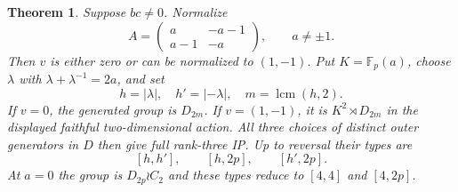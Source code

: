 \documentclass[11pt]{article}
\newtheorem{theorem}{Theorem}\newtheorem{lemma}[theorem]{Lemma}
\newcommand{\F}{\mathbb F}\newcommand{\gen}[1]{\langle#1\rangle}
\begin{document}
\begin{theorem}\label{generic}
Suppose $bc\ne0$. Normalize
\[
 A=\begin{pmatrix}a&-a-1\\a-1&-a\end{pmatrix},\qquad a\ne\pm1.
                                                               \tag{2}
\]
Then $v$ is either zero or can be normalized to $(1,-1)$.
Put $K=\F_p(a)$, choose $\lambda$ with
$\lambda+\lambda^{-1}=2a$, and set
\[
 h=|\lambda|,\quad h'=|{-\lambda}|,\quad m=\operatorname{lcm}(h,2).
\]
If $v=0$, the generated group is $D_{2m}$. If $v=(1,-1)$, it is
$K^2\rtimes D_{2m}$ in the displayed faithful two-dimensional action.
All three choices of distinct outer generators in $D$ then give full
rank-three IP. Up to reversal their types are
\[
                  [h,h'],\qquad[h,2p],\qquad[h',2p].    \tag{3}
\]
At $a=0$ the group is $D_{2p}\wr C_2$ and these types reduce to
$[4,4]$ and $[4,2p]$.
\end{theorem}
\end{document}
